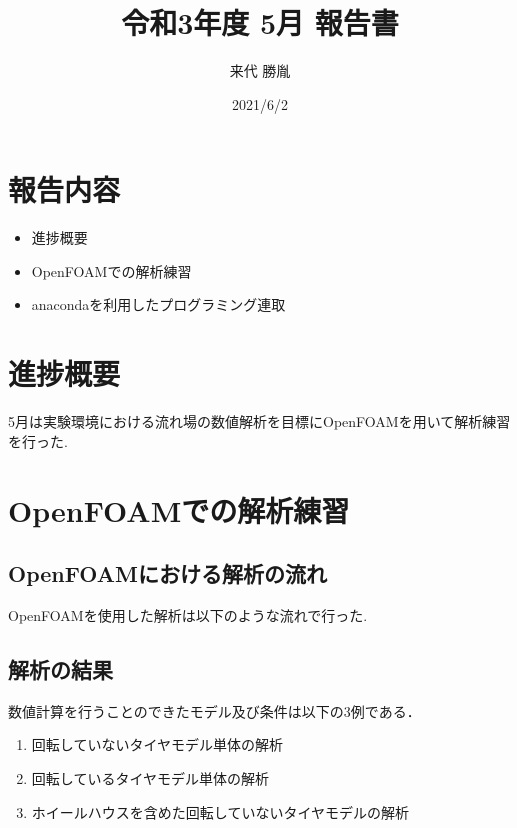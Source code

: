 \documentclass[twocolumn,a4j]{jsarticle}
\author{来代 勝胤}
\title{令和3年度 5月 報告書}
\date{2021/6/2}
\begin{document}
\columnseprule=0.1mm
\maketitle
\section*{\large 報告内容}
\begin{itemize}
    \item 進捗概要
    \item OpenFOAMでの解析練習
    \item anacondaを利用したプログラミング連取
\end{itemize}
\section{\large 進捗概要}
5月は実験環境における流れ場の数値解析を目標にOpenFOAMを用いて解析練習を行った.
\section{\large OpenFOAMでの解析練習}
\subsection{OpenFOAMにおける解析の流れ}
OpenFOAMを使用した解析は以下のような流れで行った.\\
\subsection{解析の結果}
数値計算を行うことのできたモデル及び条件は以下の3例である．
\renewcommand{\labelenumi}{(\alph{enumi})}
\begin{enumerate}
    \item 回転していないタイヤモデル単体の解析
    \item 回転しているタイヤモデル単体の解析
    \item ホイールハウスを含めた回転していないタイヤモデルの解析
\end{enumerate}
\end{document}

